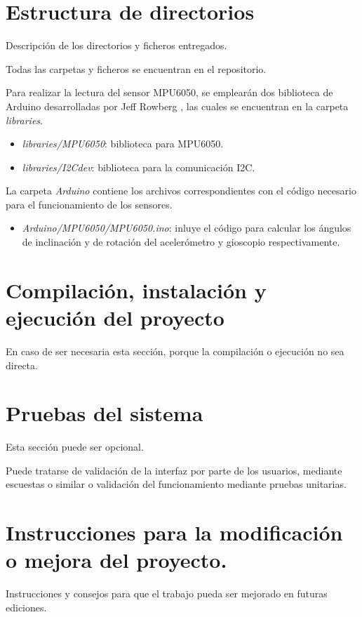 
\section{Estructura de directorios}

Descripción de los directorios y ficheros entregados.

Todas las carpetas y ficheros se encuentran en el repositorio.

Para realizar la lectura del sensor MPU6050, se emplearán dos biblioteca de Arduino desarrolladas por Jeff Rowberg \cite{website:github.com/jrowberg}, las cuales se encuentran en la carpeta \textit{libraries}.

\begin{itemize}
    \item \textit{libraries/MPU6050}: biblioteca para MPU6050.
    \item \textit{libraries/I2Cdev}: biblioteca para la comunicación I2C.
\end{itemize}

La carpeta \textit{Arduino} contiene los archivos correspondientes con el código necesario para el funcionamiento de los sensores.

\begin{itemize}
    \item \textit{Arduino/MPU6050/MPU6050.ino}: inluye el código para calcular los ángulos de inclinación y de rotación del acelerómetro y gioscopio respectivamente.

\end{itemize}

\section{Compilación, instalación y ejecución del proyecto}

En caso de ser necesaria esta sección, porque la compilación o ejecución no sea directa.


\section{Pruebas del sistema}
Esta sección puede ser opcional.

Puede tratarse de validación de la interfaz por parte de los usuarios, mediante escuestas o similar o validación del funcionamiento mediante pruebas unitarias.



\section{Instrucciones para la modificación o mejora del proyecto.}

Instrucciones y consejos para que el trabajo pueda ser mejorado en futuras ediciones.